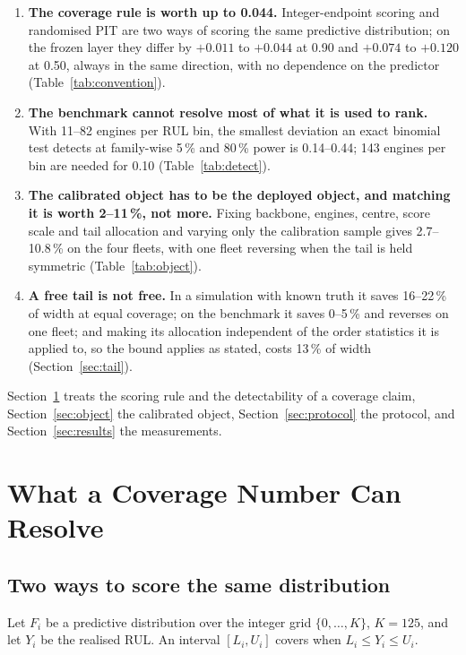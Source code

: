 \documentclass[journal]{IEEEtran}
\begin{document}
\begin{enumerate}
\item \textbf{The coverage rule is worth up to 0.044.} Integer-endpoint scoring and
randomised PIT are two ways of scoring the same predictive distribution; on the frozen layer
they differ by $+0.011$ to $+0.044$ at 0.90 and $+0.074$ to $+0.120$ at 0.50, always in the
same direction, with no dependence on the predictor (Table~\ref{tab:convention}).
\item \textbf{The benchmark cannot resolve most of what it is used to rank.} With 11--82
engines per RUL bin, the smallest deviation an exact binomial test detects at family-wise
5\,\% and 80\,\% power is 0.14--0.44; 143 engines per bin are needed for 0.10
(Table~\ref{tab:detect}).
\item \textbf{The calibrated object has to be the deployed object, and matching it is worth
2--11\,\%, not more.} Fixing backbone, engines, centre, score scale and tail allocation and
varying only the calibration sample gives 2.7--10.8\,\% on the four fleets, with one fleet
reversing when the tail is held symmetric (Table~\ref{tab:object}).
\item \textbf{A free tail is not free.} In a simulation with known truth it saves 16--22\,\%
of width at equal coverage; on the benchmark it saves 0--5\,\% and reverses on one fleet; and
making its allocation independent of the order statistics it is applied to, so the bound
applies as stated, costs 13\,\% of width (Section~\ref{sec:tail}).
\end{enumerate}

Section~\ref{sec:measure} treats the scoring rule and the detectability of a coverage claim,
Section~\ref{sec:object} the calibrated object, Section~\ref{sec:protocol} the protocol, and
Section~\ref{sec:results} the measurements.

\section{What a Coverage Number Can Resolve}\label{sec:measure}

\subsection{Two ways to score the same distribution}

Let $F_i$ be a predictive distribution over the integer grid $\{0,\dots,K\}$, $K=125$, and
let $Y_i$ be the realised RUL. An interval $[L_i,U_i]$ covers when $L_i\le Y_i\le U_i$.
\end{document}
